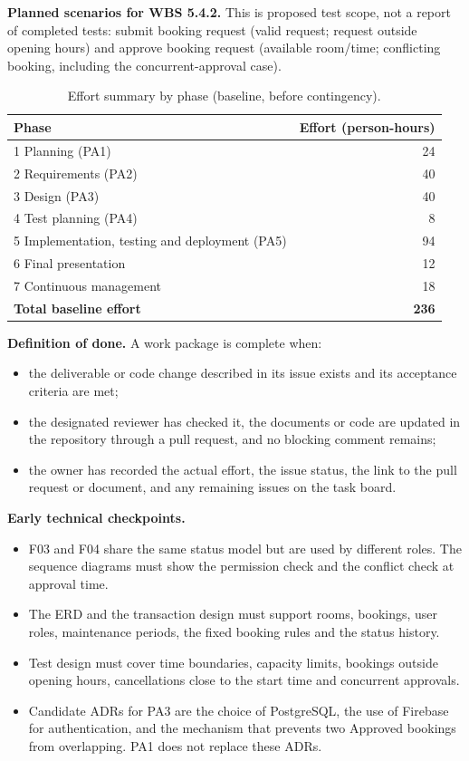 \textbf{Planned scenarios for WBS 5.4.2.} This is proposed test scope, not a
report of completed tests: submit booking request (valid request; request
outside opening hours) and approve booking request (available room/time;
conflicting booking, including the concurrent-approval case).

\begin{table}[H]
\centering
\caption{Effort summary by phase (baseline, before contingency).}
\label{tab:effort}
\begin{tabular}{@{}lr@{}}
\toprule
\textbf{Phase} & \textbf{Effort (person-hours)}\\
\midrule
1 Planning (PA1) & 24\\
2 Requirements (PA2) & 40\\
3 Design (PA3) & 40\\
4 Test planning (PA4) & 8\\
5 Implementation, testing and deployment (PA5) & 94\\
6 Final presentation & 12\\
7 Continuous management & 18\\
\midrule
\textbf{Total baseline effort} & \textbf{236}\\
\bottomrule
\end{tabular}
\end{table}

\textbf{Definition of done.} A work package is complete when:
\begin{itemize}[leftmargin=*,itemsep=2pt]
  \item the deliverable or code change described in its issue exists and its
        acceptance criteria are met;
  \item the designated reviewer has checked it, the documents or code are
        updated in the repository through a pull request, and no blocking
        comment remains;
  \item the owner has recorded the actual effort, the issue status, the link
        to the pull request or document, and any remaining issues on the task
        board.
\end{itemize}

\textbf{Early technical checkpoints.}
\begin{itemize}[leftmargin=*,itemsep=2pt]
  \item F03 and F04 share the same status model but are used by different
        roles. The sequence diagrams must show the permission check and the
        conflict check at approval time.
  \item The ERD and the transaction design must support rooms, bookings, user
        roles, maintenance periods, the fixed booking rules and the status
        history.
  \item Test design must cover time boundaries, capacity limits, bookings
        outside opening hours, cancellations close to the start time and
        concurrent approvals.
  \item Candidate ADRs for PA3 are the choice of PostgreSQL, the use of
        Firebase for authentication, and the mechanism that prevents two
        Approved bookings from overlapping. PA1 does not replace these ADRs.
\end{itemize}


